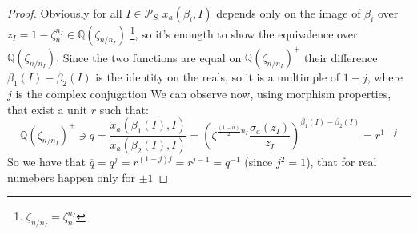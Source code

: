 \documentclass[]{article}
\theoremstyle{plain}
\theoremstyle{remark}
\theoremstyle{definition}
\newcommand{\PS}{\mathcal{P}_S}
\newcommand{\Q} {\mathbb{Q}}
\begin{document}
	\begin{proof}
		Obviously for all $ I \in \PS $ $ 	x_a(\beta_i , I) $ depends only on the image of $ \beta_i $ over $ z_I = 1- \zeta_n ^{n_I} \in \Q(\zeta_{n/n_I}) $ \footnote{ $ \zeta_{n/n_I} =  \zeta_n^{n_I} $}, so it's enougth to show the equivalence over $  \Q(\zeta_{n/n_I}). $ Since the two functions are equal on $ \Q(\zeta_{n/n_I})^+ $ their difference $ \beta_1(I) - \beta_2 (I)  $ is the identity on the reals, so it is a multimple of $ 1 - j $, where $ j $ is the complex conjugation %
		We can observe now, using morphism properties, that exist a unit $ r $ such that:
		\begin{equation*}
			\Q (\zeta_{n/n_I})^+ \ni q = \frac{x_a(\beta_1(I) , I)}{x_a(\beta_2(I) , I)} = {\left( \zeta ^{\frac{(1-a)}{2} n_I } \frac{\sigma_a (	z_I )}{z_I } \right)  }^{\beta_1(I) - \beta_2 (I)} = r ^{1-j}
		\end{equation*}	
		So we have that $ \overline{q}=q^j = r^{(1-j)j} = r^{j  - 1 }= q^{-1}$ (since $j^2 = 1 $), that for real numebers happen only for $ \pm 1 $
	\end{proof}




	\newpage
	\printbibliography
\end{document}
